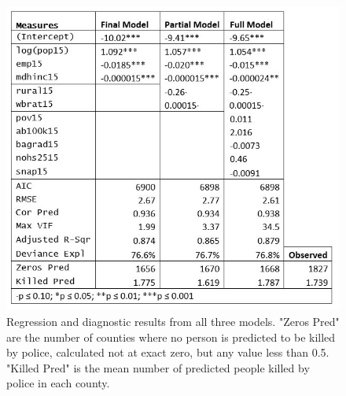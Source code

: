 \documentclass[sigconf]{acmart}
\begin{document}
\begin{figure}
\includegraphics[width=1.0\textwidth]{images/table2.jpg}
\caption{Regression and diagnostic results from all three models.  "Zeros Pred" are the number of counties where no person is predicted to be killed by police, calculated not at exact zero, but any value less than 0.5.  "Killed Pred" is the mean number of predicted people killed by police in each county.}
\end{figure}
\end{document}
